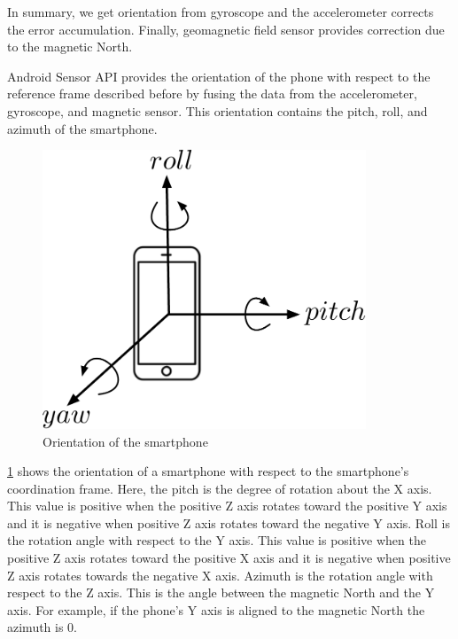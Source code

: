 In summary, we get orientation from gyroscope and the accelerometer corrects the error accumulation.
Finally, geomagnetic field sensor provides correction due to the magnetic North.

Android Sensor API \cite {api_android} provides the orientation of the phone with respect to the reference frame described before by fusing the data from the accelerometer, gyroscope, and magnetic sensor. 
This orientation contains the pitch, roll, and azimuth of the smartphone. 

%
\begin{figure}
\centering
\includegraphics[width=3.8in]{figures/roll_pitch_yaw.pdf}
\caption{Orientation of the smartphone}
\label{f:rpy_dia}
\end{figure}

\ref{f:rpy_dia} shows the orientation of a smartphone with respect to the smartphone's coordination frame.
Here, the pitch is the degree of rotation about the X axis.
This value is positive when the positive Z axis rotates toward the positive Y axis and it is negative when positive Z axis rotates toward the negative Y axis.
Roll is the rotation angle with respect to the Y axis.
This value is positive when the positive Z axis rotates toward the positive X axis and it is negative when positive Z axis rotates towards the negative X axis.
Azimuth is the rotation angle with respect to the Z axis.
This is the angle between the magnetic North and the Y axis.
For example, if the phone's Y axis is aligned to the magnetic North the azimuth is 0.

